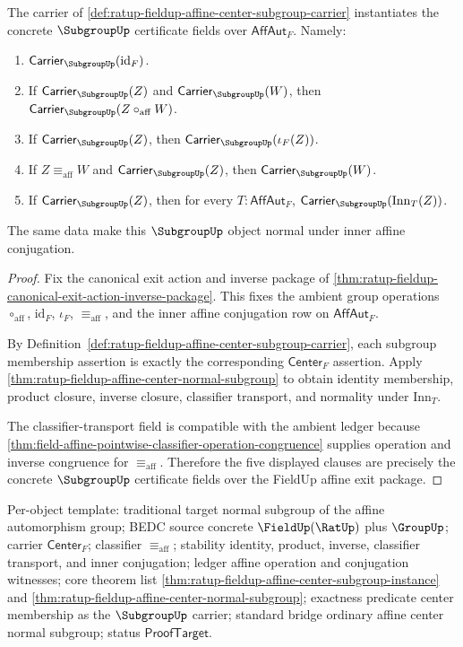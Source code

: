 \begin{theorem}
\label{thm:ratup-fieldup-affine-center-subgroup-instance}
The carrier of
\autoref{def:ratup-fieldup-affine-center-subgroup-carrier} instantiates the
concrete $\SubgroupUp$ certificate fields over $\mathsf{AffAut}_F$. Namely:
\begin{enumerate}
\item $\mathsf{Carrier}_{\SubgroupUp}(\mathrm{id}_F)$.
\item If $\mathsf{Carrier}_{\SubgroupUp}(Z)$ and
$\mathsf{Carrier}_{\SubgroupUp}(W)$, then
$\mathsf{Carrier}_{\SubgroupUp}(Z\circ_{\mathrm{aff}}W)$.
\item If $\mathsf{Carrier}_{\SubgroupUp}(Z)$, then
$\mathsf{Carrier}_{\SubgroupUp}(\iota_F(Z))$.
\item If $Z\equiv_{\mathrm{aff}}W$ and
$\mathsf{Carrier}_{\SubgroupUp}(Z)$, then
$\mathsf{Carrier}_{\SubgroupUp}(W)$.
\item If $\mathsf{Carrier}_{\SubgroupUp}(Z)$, then for every
$T:\mathsf{AffAut}_F$,
$\mathsf{Carrier}_{\SubgroupUp}(\mathrm{Inn}_T(Z))$.
\end{enumerate}
The same data make this $\SubgroupUp$ object normal under inner affine
conjugation.
\end{theorem}
\begin{proof}
Fix the canonical exit action and inverse package of
\autoref{thm:ratup-fieldup-canonical-exit-action-inverse-package}. This fixes
the ambient group operations $\circ_{\mathrm{aff}}$, $\mathrm{id}_F$,
$\iota_F$, $\equiv_{\mathrm{aff}}$, and the inner affine conjugation row on
$\mathsf{AffAut}_F$.

By Definition~\ref{def:ratup-fieldup-affine-center-subgroup-carrier}, each
subgroup membership assertion is exactly the corresponding
$\mathsf{Center}_F$ assertion. Apply
\autoref{thm:ratup-fieldup-affine-center-normal-subgroup} to obtain identity
membership, product closure, inverse closure, classifier transport, and
normality under $\mathrm{Inn}_T$.

The classifier-transport field is compatible with the ambient ledger because
\autoref{thm:field-affine-pointwise-classifier-operation-congruence} supplies
operation and inverse congruence for $\equiv_{\mathrm{aff}}$. Therefore the
five displayed clauses are precisely the concrete $\SubgroupUp$ certificate
fields over the FieldUp affine exit package.
\end{proof}

Per-object template: traditional target normal subgroup of the affine
automorphism group; BEDC source concrete $\FieldUp(\RatUp)$ plus $\GroupUp$;
carrier $\mathsf{Center}_F$; classifier $\equiv_{\mathrm{aff}}$; stability
identity, product, inverse, classifier transport, and inner conjugation; ledger
affine operation and conjugation witnesses; core theorem list
\autoref{thm:ratup-fieldup-affine-center-subgroup-instance} and
\autoref{thm:ratup-fieldup-affine-center-normal-subgroup}; exactness predicate
center membership as the $\SubgroupUp$ carrier; standard bridge ordinary
affine center normal subgroup; status $\mathsf{ProofTarget}$.

